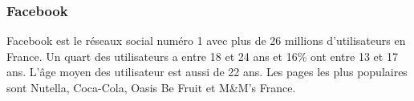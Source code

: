 \subsubsection{Facebook}
Facebook est le réseaux social numéro 1 avec plus de 26 millions d'utilisateurs en France. Un quart des utilisateurs a entre 18 et 24 ans et 16\% ont entre 13 et 17 ans. L'âge moyen des utilisateur est aussi de 22 ans.
Les pages les plus populaires sont Nutella, Coca-Cola, Oasis Be Fruit et M\&M's France. 
